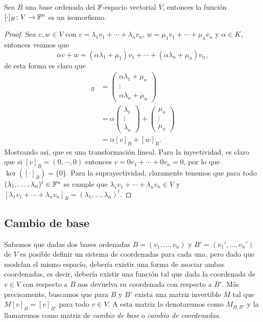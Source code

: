 \begin{prop}
  Sea $B$ una base ordenada del $\mathbb{F}$-espacio vectorial $V$, entonces la función $[\cdot]_B\colon V \to \mathbb{F}^n$ es un isomorfismo.
\end{prop}
\begin{proof}
  Sea $v,w \in V$ con $v = \lambda_1 v_1 + \cdots + \lambda_n v_n$, $w = \mu_1 v_1 + \cdots + \mu_n v_n$ y $\alpha \in K$, entonces veamos que
  \[
  \alpha v+w =  (\alpha\lambda_1+\mu_1) v_1 + \cdots + (\alpha\lambda_n+\mu_n) v_n,
  \]
  de esta forma es claro que
  \begin{align*}
    [v+w]_B 
      &= \begin{pmatrix} \alpha\lambda_1+\mu_n \\ \vdots \\ \alpha\lambda_n+\mu_n \end{pmatrix} \\
      &= \alpha\begin{pmatrix} \lambda_1 \\ \vdots \\ \lambda_n \end{pmatrix}
       + \begin{pmatrix} \mu_n \\ \vdots \\ \mu_n  \end{pmatrix} \\
      &= \alpha[v]_B + [w]_B.
  \end{align*}
  Mostrando así, que es una transformación lineal. Para la inyectividad, es claro que si $[v]_B = (0,\cdots,0)$ entonces $v = 0v_1 + \cdots + 0v_n = 0$, por lo que $\ker([\cdot]_B) = \{0\}$. Para la suprayectividad, claramente tenemos que para todo $(\lambda_1, \ldots, \lambda_n)^t \in \mathbb{F}^n$ se cumple que $\lambda_1 v_1 + \cdots + \lambda_n v_n \in V$ y  $[\lambda_1 v_1 + \cdots  + \lambda_n v_n]_B = (\lambda_1, \ldots, \lambda_n)^t$.
\end{proof}


\subsection{Cambio de base}

Sabemos que dadas dos bases ordenadas $B = (v_1,\ldots,v_n)$ y $B' = (v_1',\ldots,v_n')$ de $V$ es posible definir un sistema de coordenadas para cada una, pero dado que modelan el mismo espacío, debería existir una forma de asociar ambas coordenadas, es decir, debería existir una función tal que dada la coordenada de $v \in V$ con respecto a $B$ nos devuelva su coordenada con respecto a $B'$. Más precisamente, buscamos que para $B$ y $B'$ exista una matriz invertible $M$ tal que $M [v]_B = [v]_{B'}$ para todo $v \in V$. A esta matriz la denotaremos como $M_{B,B'}$ y la llamaremos como matriz de \emph{cambio de base} o \emph{cambio de coordenadas}.

